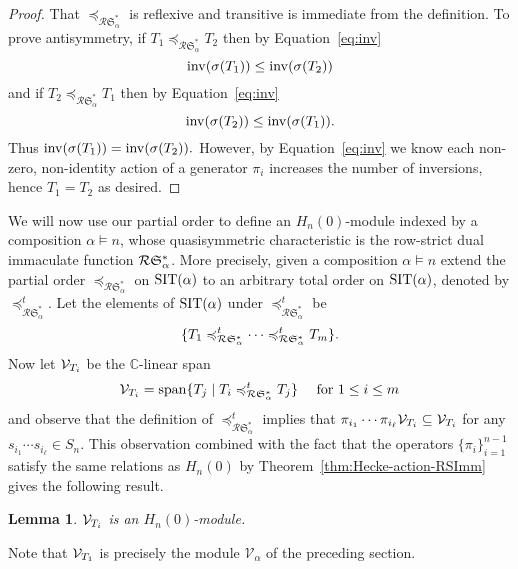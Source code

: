 \documentclass[12pt,letterpaper]{amsart}
\newtheorem{lemma}[theorem]{Lemma}
\theoremstyle{definition}
\newcommand{\poRI}{\preccurlyeq_{\mathcal{R}{\mathfrak{S}}^\ast _\alpha}}  \newcommand{\poA}{\preccurlyeq_{\mathcal{A}^\ast _\alpha}}  \newcommand{\poAbar}{\preccurlyeq_{\mathcal{\bar{A}}^\ast _\alpha} } \newcommand{\poRIcover}{\prec_{\mathcal{R}{\mathfrak{S}}^\ast _\alpha}}
\newcommand{\hn}{H_n(0)}
\newcommand{\suchthat}{\;|\;}
\newcommand{\spam}{\operatorname{span}}
\begin{document}
\begin{proof} That $\poRI$ is reflexive and transitive is immediate from the definition. To prove antisymmetry, if  $T_1 \poRI T_2$ then by Equation~\eqref{eq:inv}
$$\mathrm{inv} (\sigma (T_1)) \leq \mathrm{inv} (\sigma (T_2))$$and if $T_2 \poRI T_1$ then by Equation~\eqref{eq:inv}
$$\mathrm{inv} (\sigma (T_2)) \leq \mathrm{inv} (\sigma (T_1)).$$ Thus $\mathrm{inv} (\sigma (T_1)) = \mathrm{inv} (\sigma (T_2)).$ However, by Equation~\eqref{eq:inv} we know each non-zero, non-identity action of a generator $\pi_i$  increases the number of inversions, hence $T_1=T_2$ as desired.
\end{proof}

We will now use our partial order to define an $\hn$-module indexed by a composition $\alpha \vDash n$, whose quasisymmetric characteristic is the row-strict dual immaculate function $\mathcal{R}{\mathfrak{S}}^\ast _\alpha$. More precisely, given a composition $\alpha \vDash n$ extend the partial order $\poRI$ on $\operatorname{SIT} (\alpha)$ to an arbitrary total order on $\operatorname{SIT} (\alpha)$, denoted by $\poRI ^t$. Let the elements of $\operatorname{SIT} (\alpha)$ under $\poRI ^t$ be $$\{\rtau _1 \poRI ^t  \cdots \poRI ^t \rtau _m  \}.$$ Now let $\mathcal{V}_{{T}_i}$ be the $\mathbb{C}$-linear span 
 $$\mathcal{V}_{\rtau_i} = \spam \{ \rtau _j \suchthat \rtau _i \poRI ^t \rtau _j \}\quad \text{ for } 1\leq i \leq m$$
and observe that the definition of $\poRI ^t$ implies that $\pi_{i_1}\cdots \pi _{i_\ell}\mathcal{V}_{{T}_i}\subseteq \mathcal{V}_{{T}_i}$ for any $s_{i_1}\cdots s _{i_\ell}\in S_n$. This observation combined with the fact that the operators $\{\pi_i\}_{i=1}^{n-1}$ satisfy the same relations as $\hn$ by Theorem~\ref{thm:Hecke-action-RSImm} gives the following result.
\begin{lemma}\label{lem:hnmodule}
$\mathcal{V}_{{T}_i}$ is an $\hn$-module.
\end{lemma}

Note that $\mathcal{V}_{{T}_1}$ is precisely the module $\mathcal{V}_\alpha$ of the preceding section.
\end{document}
